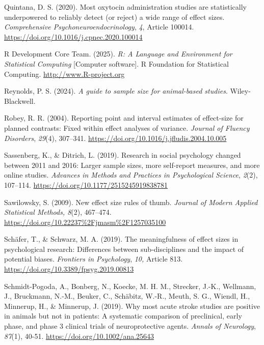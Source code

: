 \documentclass[authordate, meta]{jote-new-article}
\begin{document}
	Quintana, D. S. (2020). Most oxytocin administration studies are statistically underpowered to reliably detect (or reject) a wide range of effect sizes. \emph{Comprehensive Psychoneuroendocrinology}, \emph{4}, Article 100014. \url{https://doi.org/10.1016/j.cpnec.2020.100014}



	R Development Core Team. (2025). \emph{R: A Language and Environment for Statistical Computing} [Computer software]. R Foundation for Statistical Computing. \url{http://www.R-project.org}



	Reynolds, P. S. (2024). \emph{A guide to sample size for animal-based studies}. Wiley-Blackwell.



	Robey, R. R. (2004). Reporting point and interval estimates of effect-size for planned contrasts: Fixed within effect analyses of variance. \emph{Journal of Fluency Disorders}, \emph{29}(4), 307--341. \url{https://doi.org/10.1016/j.jfludis.2004.10.005}



	Sassenberg, K., \& Ditrich, L. (2019). Research in social psychology changed between 2011 and 2016: Larger sample sizes, more self-report measures, and more online studies. \emph{Advances in Methods and Practices in Psychological Science}, \emph{2}(2), 107--114. \url{https://doi.org/10.1177/2515245919838781}



	Sawilowsky, S. (2009). New effect size rules of thumb. \emph{Journal of Modern Applied Statistical Methods, 8}(2), 467--474. \url{https://doi.org/10.22237\%2Fjmasm\%2F1257035100}



	Schäfer, T., \& Schwarz, M. A. (2019). The meaningfulness of effect sizes in psychological research: Differences between sub-disciplines and the impact of potential biases. \emph{Frontiers in Psychology}, \emph{10, }Article 813. \url{https://doi.org/10.3389/fpsyg.2019.00813}



	Schmidt-Pogoda, A., Bonberg, N., Koecke, M. H. M., Strecker, J.-K., Wellmann, J., Bruckmann, N.-M., Beuker, C., Schäbitz, W.-R., Meuth, S. G., Wiendl, H., Minnerup, H., \& Minnerup, J. (2019). Why most acute stroke studies are positive in animals but not in patients: A systematic comparison of preclinical, early phase, and phase 3 clinical trials of neuroprotective agents. \emph{Annals of Neurology}, \emph{87}(1), 40-51. \url{https://doi.org/10.1002/ana.25643}
\end{document}
